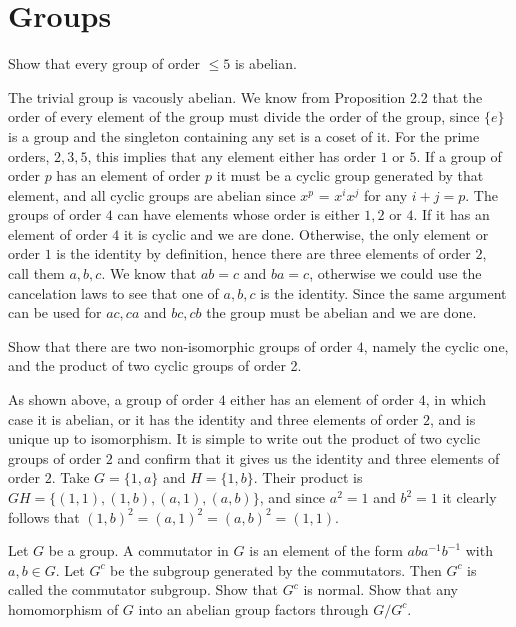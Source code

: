 \section{Groups}

\begin{problem}
  Show that every group of order $\le 5$ is abelian.
\end{problem}

\begin{solution}
  The trivial group is vacously abelian.
  We know from Proposition 2.2 that the order of every element of the group must divide the order of the group, since $\{e\}$ is a group and the singleton containing any set is a coset of it.
  For the prime orders, $2, 3, 5$, this implies that any element either has order $1$ or $5$.
  If a group of order $p$ has an element of order $p$ it must be a cyclic group generated by that element, and all cyclic groups are abelian since $x^p$ = $x^i x^j$ for any $i + j = p$.
  The groups of order $4$ can have elements whose order is either $1, 2$ or $4$.
  If it has an element of order $4$ it is cyclic and we are done.
  Otherwise, the only element or order $1$ is the identity by definition, hence there are three elements of order $2$, call them $a, b, c$.
  We know that $ab = c$ and $ba = c$, otherwise we could use the cancelation laws to see that one of $a, b, c$ is the identity.
  Since the same argument can be used for $ac, ca$ and $bc, cb$ the group must be abelian and we are done.
\end{solution}

\begin{problem}
  Show that there are two non-isomorphic groups of order $4$, namely the cyclic one, and the product of two cyclic groups of order 2.
\end{problem}

\begin{solution}
  As shown above, a group of order $4$ either has an element of order $4$, in which case it is abelian, or it has the identity and three elements of order $2$, and is unique up to isomorphism.
  It is simple to write out the product of two cyclic groups of order $2$ and confirm that it gives us the identity and three elements of order $2$.
  Take $G = \{1, a\}$ and $H = \{1, b\}$.
  Their product is $GH = \{(1, 1), (1, b), (a, 1), (a, b)\}$, and since $a^2 = 1$ and $b^2 = 1$ it clearly follows that $(1, b)^2 = (a, 1)^2 = (a, b)^2 = (1, 1)$.
\end{solution}

\begin{problem}
  Let $G$ be a group.
  A commutator in $G$ is an element of the form $aba^{-1}b^{-1}$ with $a, b \in G$.
  Let $G^c$ be the subgroup generated by the commutators.
  Then $G^c$ is called the commutator subgroup.
  Show that $G^c$ is normal.
  Show that any homomorphism of $G$ into an abelian group factors through $G/G^c$.
\end{problem}


